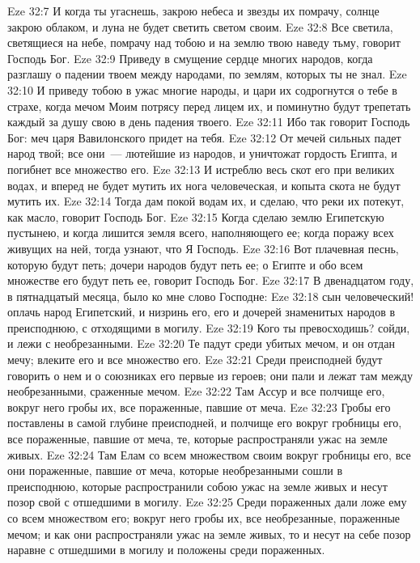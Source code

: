\vs Eze 32:7 И когда ты угаснешь, закрою небеса и звезды их помрачу, солнце закрою облаком, и луна не будет светить светом своим.
\vs Eze 32:8 Все светила, светящиеся на небе, помрачу над тобою и на землю твою наведу тьму, говорит Господь Бог.
\vs Eze 32:9 Приведу в смущение сердце многих народов, когда разглашу о падении твоем между народами, по землям, которых ты не знал.
\vs Eze 32:10 И приведу тобою в ужас многие народы, и цари их содрогнутся о тебе в страхе, когда мечом Моим потрясу перед лицем их, и поминутно будут трепетать каждый за душу свою в день падения твоего.
\vs Eze 32:11 Ибо так говорит Господь Бог: меч царя Вавилонского придет на тебя.
\vs Eze 32:12 От мечей сильных падет народ твой; все они~--- лютейшие из народов, и уничтожат гордость Египта, и погибнет все множество его.
\vs Eze 32:13 И истреблю весь скот его при великих водах, и вперед не будет мутить их нога человеческая, и копыта скота не будут мутить их.
\vs Eze 32:14 Тогда дам покой водам их, и сделаю, что реки их потекут, как масло, говорит Господь Бог.
\vs Eze 32:15 Когда сделаю землю Египетскую пустынею, и когда лишится земля всего, наполняющего ее; когда поражу всех живущих на ней, тогда узнают, что Я Господь.
\vs Eze 32:16 Вот плачевная песнь, которую будут петь; дочери народов будут петь ее; о Египте и обо всем множестве его будут петь ее, говорит Господь Бог.
\rsbpar\vs Eze 32:17 В двенадцатом году, в пятнадцатый  месяца, было ко мне слово Господне:
\vs Eze 32:18 сын человеческий! оплачь народ Египетский, и низринь его, его и дочерей знаменитых народов в преисподнюю, с отходящими в могилу.
\vs Eze 32:19 Кого ты превосходишь? сойди, и лежи с необрезанными.
\vs Eze 32:20 Те падут среди убитых мечом, и он отдан мечу; влеките его и все множество его.
\vs Eze 32:21 Среди преисподней будут говорить о нем и о союзниках его первые из героев; они пали и лежат там между необрезанными, сраженные мечом.
\vs Eze 32:22 Там Ассур и все полчище его, вокруг него гробы их, все пораженные, павшие от меча.
\vs Eze 32:23 Гробы его поставлены в самой глубине преисподней, и полчище его вокруг гробницы его, все пораженные, павшие от меча, те, которые распространяли ужас на земле живых.
\vs Eze 32:24 Там Елам со всем множеством своим вокруг гробницы его, все они пораженные, павшие от меча, которые необрезанными сошли в преисподнюю, которые распространили собою ужас на земле живых и несут позор свой с отшедшими в могилу.
\vs Eze 32:25 Среди пораженных дали ложе ему со всем множеством его; вокруг него гробы их, все необрезанные, пораженные мечом; и как они распространяли ужас на земле живых, то и несут на себе позор наравне с отшедшими в могилу и положены среди пораженных.
